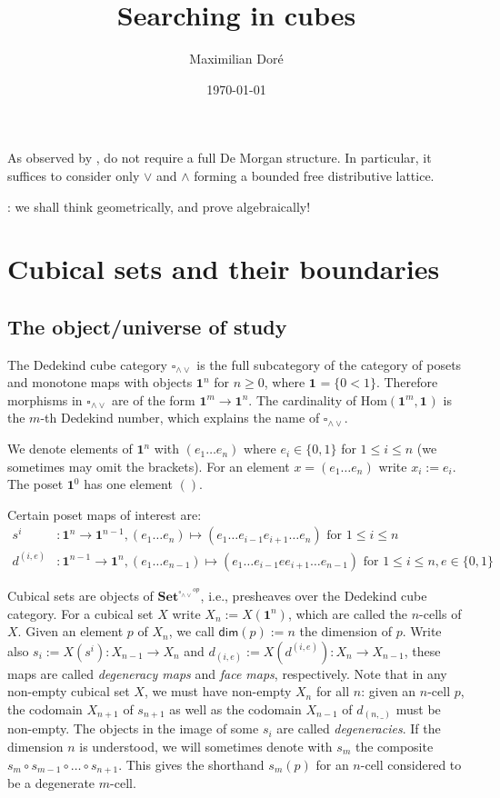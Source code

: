 \documentclass[11pt]{article}
\title{ Searching in cubes}
\author{ Maximilian Dor\'e}
\date{\today}
\theoremstyle{definition}
\newcommand{\mdef}{:=}
\newcommand{\mname}[1]{\textit{{#1}}}
\newcommand{\join}{\wedge}
\newcommand{\meet}{\vee}
\newcommand{\dedekind}{\square_{\join \meet}}
\newcommand{\pint}[1]{\mathbf{1}^{#1}}
\newcommand{\psh}[1]{\mathbf{Set}^{{#1}^{op}}}
\renewcommand{\hom}[2]{\text{Hom}({#1} , {#2})}
\renewcommand{\dim}[1]{\mathsf{dim}({#1})}
\newcommand{\smap}[1]{s_{{#1}}}
\newcommand{\dmap}[2]{d_{({#1} , {#2})}}
\begin{document}
\maketitle	

As observed by \cite{orton17_axiom_model_cubic_type_theor_topos}, do not require
a full De Morgan structure. In particular, it suffices to consider only $\meet$
and $\join$ forming a bounded free distributive lattice.

\cite{williamson12_combin_homot_theor}: we shall think geometrically, and prove
algebraically!


\section{Cubical sets and their boundaries}

\subsection{The object/universe of study}

The Dedekind cube category $\dedekind$ is the full subcategory of the category
of posets and monotone maps with objects $\pint{n}$ for $n \geq 0$, where $\pint{}
= \{ 0<1 \}$. Therefore morphisms in $\dedekind$ are of
the form $\pint{m} \to \pint{n}$. The cardinality of $\hom{\pint{m}}{\pint{}}$ is the
$m$-th Dedekind number, which explains the name of $\dedekind$.

We denote elements of $\pint{n}$ with $(e_1 \ldots e_n)$ where $e_i \in \{0,1\}$
for $1 \leq i \leq n$ (we sometimes may omit the brackets). For an element $x =
(e_1 \ldots e_n)$ write $x_i \mdef e_i$. The poset $\pint{0}$ has one element
$()$.

Certain poset maps of interest are:
\begin{align*}
  s^i &: \pint{n} \to \pint{n-1}, (e_1 \ldots e_n) \mapsto (e_1 \ldots e_{i-1} e_{i+1} \ldots e_n) \text{ for } 1 \leq i \leq n\\
  d^{(i,e)} &: \pint{n-1} \to \pint{n}, 
      (e_1 \ldots e_{n-1}) \mapsto (e_1 \ldots e_{i-1} e e_{i+1} \ldots e_{n-1}) \text{ for } 1 \leq i \leq n, e \in \{0,1\}
\end{align*}


Cubical sets are objects of $\psh{\dedekind}$, i.e., presheaves over the
Dedekind cube category. For a cubical set $X$ write $X_n \mdef X(\pint{n})$,
which are called the $n$-cells of $X$. Given an element $p$ of $X_n$, we call
$\dim{p} \mdef n$ the dimension of $p$. Write also $\smap{i} \mdef X(s^i) : X_{n-1}
\to X_n$ and $\dmap{i}{e} \mdef X(d^{(i,e)}) : X_n \to X_{n-1}$, these maps are
called \mname{degeneracy maps} and \mname{face maps}, respectively. Note that in any non-empty
cubical set $X$, we must have non-empty $X_n$ for all $n$: given an $n$-cell
$p$, the codomain $X_{n+1}$ of $\smap{n+1}$ as well as the codomain $X_{n-1}$ of
$\dmap{n}{\_}$ must be non-empty. The objects in the image of some $\smap{i}$ are
called \mname{degeneracies}. If the dimension $n$ is understood, we will sometimes
denote with $\smap{m}$ the composite $\smap{m} \circ \smap{m-1} \circ \ldots
\circ \smap{n+1}$. This gives the shorthand $\smap{m}(p)$ for an $n$-cell
considered to be a degenerate $m$-cell.
\end{document}
